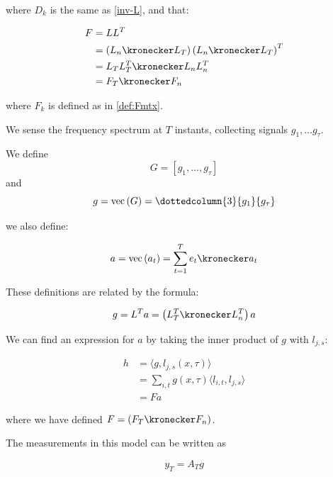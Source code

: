where \(D_k\) is the same as \eqref{inv-L}, and that:

\begin{align}
F &= LL^T \\
&= \left(L_n \kronecker L_T\right)\left(L_n \kronecker L_T\right)^T\\
&=L_TL_T^T \kronecker L_nL_n^T \\
&= F_T \kronecker F_n
\end{align}

where \(F_k\) is defined as in \eqref{def:Fmtx}.

We sense the frequency spectrum at \(T\) instants, collecting signals \(g_1, \ldots g_\tau\). 

\begin{definition}
We define
\begin{equation}
G = \left[g_1, \ldots, g_\tau \right]
\end{equation}
and
\begin{equation}
g = \mathrm{vec}\left(G\right) = \dottedcolumn{3}{g_1}{g_\tau}
\end{equation}
\end{definition}

we also define:

\begin{definition}
\begin{equation}
a = \mathrm{vec}\left(a_t\right) = \sum_{t=1}^T e_t \kronecker a_t
\end{equation}
\end{definition}

These definitions are related by the formula:

\begin{equation}
g = L^Ta = \left(L_T^T \kronecker L_n^T\right)a
\end{equation}

We can find an expression for \(a\) by taking the inner product of \(g\) with \(l_{j,s}\):

\begin{align*}
h &= \langle g, l_{j,s}\left(x, \tau\right)\rangle \\
&= \sum_{i,t} g(x,\tau) \langle l_{i,t}, l_{j,s} \rangle \\
&= Fa
\end{align*}

where we have defined \(F = \left(F_T \kronecker F_n\right)\).

The measurements in this model can be written as

\begin{equation}
y_T = A_Tg
\end{equation}


